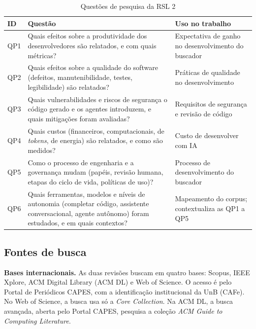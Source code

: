\begin{table}[htbp]
	\centering
	\caption{Questões de pesquisa da RSL 2}
	\label{tab:qp-rsl2}
	\small
	\begin{tabular}{p{0.9cm}p{9.2cm}>{\raggedright\arraybackslash}p{4.2cm}}
		\hline
		\textbf{ID} & \textbf{Questão} & \textbf{Uso no trabalho} \\
		\hline
		QP1 & Quais efeitos sobre a produtividade dos desenvolvedores são
		relatados, e com quais métricas? &
		Expectativa de ganho no desenvolvimento do buscador \\
		\hline
		QP2 & Quais efeitos sobre a qualidade do software (defeitos,
		manutenibilidade, testes, legibilidade) são relatados? &
		Práticas de qualidade no desenvolvimento \\
		\hline
		QP3 & Quais vulnerabilidades e riscos de segurança o código gerado e
		os agentes introduzem, e quais mitigações foram avaliadas? &
		Requisitos de segurança e revisão de código \\
		\hline
		QP4 & Quais custos (financeiros, computacionais, de \textit{tokens},
		de energia) são relatados, e como são medidos? &
		Custo de desenvolver com IA \\
		\hline
		QP5 & Como o processo de engenharia e a governança mudam (papéis,
		revisão humana, etapas do ciclo de vida, políticas de uso)? &
		Processo de desenvolvimento do buscador \\
		\hline
		QP6 & Quais ferramentas, modelos e níveis de autonomia (completar
		código, assistente conversacional, agente autônomo) foram estudados,
		e em quais contextos? &
		Mapeamento do corpus; contextualiza as QP1 a QP5 \\
		\hline
	\end{tabular}
\end{table}

\subsection{Fontes de busca}

\textbf{Bases internacionais.} As duas revisões buscam em quatro bases:
Scopus, IEEE Xplore, ACM Digital Library (ACM DL) e Web of Science. O acesso é
pelo Portal de Periódicos CAPES, com a identificação institucional da UnB
(CAFe). No Web of Science, a busca usa só a \textit{Core Collection}. Na ACM
DL, a busca avançada, aberta pelo Portal CAPES, pesquisa a coleção
\textit{ACM Guide to Computing Literature}.

